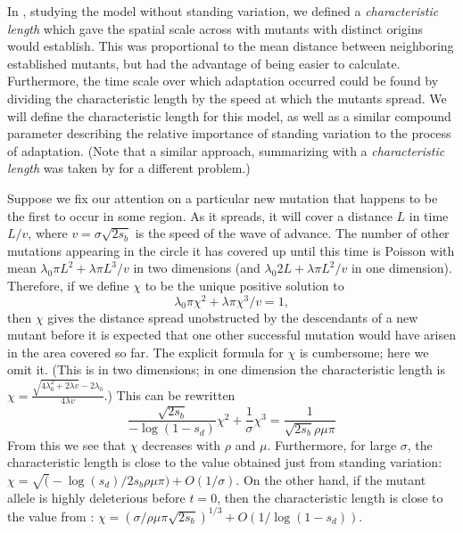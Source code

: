 \documentclass{article}
\begin{document}

In \citet{ralphcoop2010}, studying the model without standing variation,
we defined a {\em characteristic length} which gave the spatial scale across with mutants with distinct origins would establish.
This was proportional to the mean distance between neighboring established mutants,
but had the advantage of being easier to calculate.
Furthermore, the time scale over which adaptation occurred could be found by dividing the characteristic length 
by the speed at which the mutants spread.
We will define the characteristic length for this model,
as well as a similar compound parameter describing the relative importance of standing variation to the process of adaptation.
(Note that a similar approach, summarizing with a {\em characteristic length} was taken by \citep{slatkin1973geneflow} for a different problem.)

Suppose we fix our attention on a particular new mutation that happens to be the first to occur in some region.
As it spreads, it will cover a distance $L$ in time $L/v$, where $v = \sigma \sqrt{2s_b}$ is the speed of the wave of advance.
The number of other mutations appearing in the circle it has covered up until this time is Poisson with mean
$\lambda_0 \pi L^2 + \lambda \pi L^3 /v$ in two dimensions
(and $\lambda_0 2 L + \lambda \pi L^2 /v$ in one dimension).
Therefore, if we define $\chi$ to be the unique positive solution to
\[
    \lambda_0 \pi \chi^2 + \lambda \pi \chi^3 /v = 1,
\]
then $\chi$ gives the distance spread unobstructed by the descendants of a new mutant
before it is expected that one other successful mutation would have arisen in the area covered so far.
The explicit formula for $\chi$ is cumbersome; here we omit it.
(This is in two dimensions; in one dimension the characteristic length is $\chi = \frac{ \sqrt{ 4 \lambda_0^2 + 2\lambda v } - 2 \lambda_0 }{ 4 \lambda v }$.)
This can be rewritten 
\begin{equation} \label{eqn:defines_chi}
   \frac{\sqrt{2s_b} }{-\log(1-s_d) } \chi^2 + \frac{1}{\sigma} \chi^3 = \frac{1}{\sqrt{2s_b} \rho\mu\pi}
\end{equation}
From this we see that $\chi$ decreases with $\rho$ and $\mu$.
Furthermore, for large $\sigma$, the characteristic length is close to the value obtained just from standing variation:
$\chi = \sqrt( -\log(s_d) / 2 s_b \rho \mu \pi ) + O(1/\sigma)$.
On the other hand, if the mutant allele is highly deleterious before $t=0$,
then the characteristic length is close to the value from \citet{ralphcoop2010}:
$\chi = ( \sigma / \rho \mu \pi \sqrt{2 s_b} )^{1/3} + O(1/\log(1-s_d))$.
\end{document}
